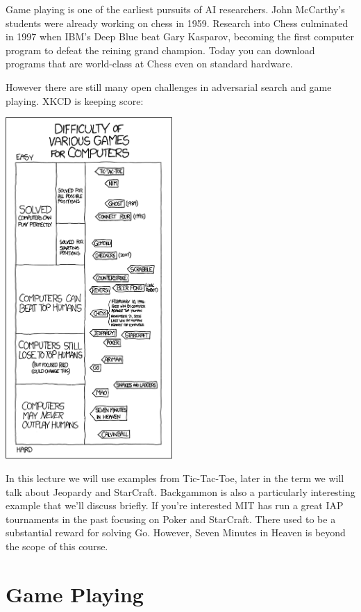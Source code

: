 \documentclass[11pt]{article}
\begin{document}
Game playing is one of the earliest pursuits of AI researchers. John McCarthy's students were already working on chess in 1959. Research into Chess culminated in 1997 when IBM's Deep Blue beat Gary Kasparov, becoming the first computer program to defeat the reining grand champion. Today you can download programs that are world-class at Chess even on standard hardware. 

However there are still many open challenges in adversarial search and game playing. XKCD is keeping score:

 
\begin{center}
  \includegraphics[height=13cm]{../pics/game_ais}
\end{center}

\noindent In this lecture we will use examples from Tic-Tac-Toe, later in the term we will talk about Jeopardy and StarCraft. Backgammon is also a particularly interesting example that we'll discuss briefly. If you're interested MIT has run a great IAP tournaments in the past focusing on Poker and StarCraft. There used to be a substantial reward for solving Go. However, Seven Minutes in Heaven is beyond the scope of this course.

\section{Game Playing}
\end{document}
